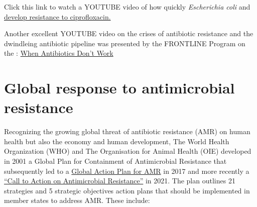 \documentclass[
  letterpaper,
  DIV=11,
  numbers=noendperiod]{scrreprt}
\begin{document}
\begin{tcolorbox}[enhanced jigsaw, toptitle=1mm, colframe=quarto-callout-note-color-frame, arc=.35mm, rightrule=.15mm, title=\textcolor{quarto-callout-note-color}{\faInfo}\hspace{0.5em}{How quickly can antibiotics develop resistance?}, leftrule=.75mm, opacityback=0, opacitybacktitle=0.6, breakable, coltitle=black, toprule=.15mm, colback=white, colbacktitle=quarto-callout-note-color!10!white, bottomtitle=1mm, titlerule=0mm, bottomrule=.15mm, left=2mm]

Click this link to watch a YOUTUBE video of how quickly
\emph{Escherichia coli} and
\href{https://www.youtube.com/watch?v=bDa4-nSc7J8}{develop resistance to
ciprofloxacin.}

Another excellent YOUTUBE video on the crises of antibiotic resistance
and the dwindleing antibiotic pipeline was presented by the FRONTLINE
Program on the :
\href{https://www.youtube.com/watch?v=EkyAuG9RSSU\&t=1250s}{When
Antibiotics Don't Work}

\end{tcolorbox}

\hypertarget{global-response-to-antimicrobial-resistance}{%
\section*{Global response to antimicrobial
resistance}\label{global-response-to-antimicrobial-resistance}}


Recognizing the growing global threat of antibiotic resistance (AMR) on
human health but also the economy and human development, The World
Health Organization (WHO) and The Organisation for Animal Health (OIE)
developed in 2001 a Global Plan for Containment of Antimicrobial
Resistance that subsequently led to a
\href{https://www.who.int/publications/i/item/9789241509763}{Global
Action Plan for AMR} in 2017 and more recently a
\href{https://www.who.int/news/item/30-07-2021-call-to-action-on-antimicrobial-resistance-2021}{``Call
to Action on Antimicrobial Resistance''} in 2021. The plan outlines 21
strategies and 5 strategic objectives action plans that should be
implemented in member states to address AMR. These include:
\end{document}
